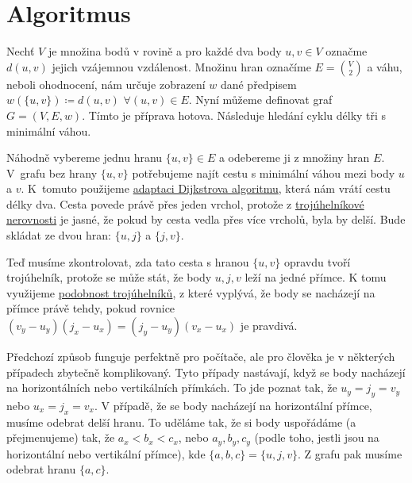 \section{Algoritmus}
\label{sec:algoritmus}

Nechť $V$ je množina bodů v rovině a pro každé dva body $u, v \in V$ označme $d(u, v)$ jejich vzájemnou vzdálenost. Množinu hran označíme $E = \binom{V}{2}$ a váhu, neboli ohodnocení, nám určuje zobrazení $w$ dané předpisem $w(\{u, v\}) \coloneqq d(u, v)$ $\forall (u, v) \in E$. Nyní můžeme definovat graf $G = (V, E, w)$.
Tímto je příprava hotova. Následuje hledání cyklu délky tři s minimální váhou.



Náhodně vybereme jednu hranu $\{u, v\} \in E$ a odebereme ji z množiny hran $E$. V~grafu bez hrany $\{u, v\}$ potřebujeme najít cestu s minimální váhou mezi body $u$ a  $v$. K~tomuto použijeme \hyperref[subsec:dijkstra_adaptace]{adaptaci Dijkstrova algoritmu}, která nám vrátí cestu délky dva. Cesta povede právě přes jeden vrchol, protože z \hyperref[tvrzeni:trojuhelnikova_nerovnost]{trojúhelníkové nerovnosti} je jasné, že pokud by cesta vedla přes více vrcholů, byla by delší. Bude skládat ze dvou hran: $\{u, j\}$ a $\{j, v\}$.

Teď musíme zkontrolovat, zda tato cesta s hranou $\{u, v\}$ opravdu tvoří trojúhelník, protože se může  stát, že body $u, j, v$ leží na jedné přímce. K tomu využijeme \hyperref[sec:podobnost]{podobnost trojúhelníků}, z které vyplývá, že body se nacházejí na přímce právě tehdy, pokud rovnice $(v_y - u_y)(j_x - u_x) = (j_y - u_y)(v_x - u_x)$ je pravdivá. 

\begin{poznamka}
Předchozí způsob funguje perfektně pro počítače, ale pro člověka je v některých případech zbytečně komplikovaný. Tyto případy nastávají, když se body nacházejí na horizontálních nebo vertikálních přímkách. To jde poznat tak, že $u_y = j_y = v_y$ nebo $u_x = j_x = v_x$.
V případě, že se body nacházejí na horizontální přímce, musíme odebrat delší hranu. To uděláme tak, že si body uspořádáme (a přejmenujeme) tak, že $a_x<b_x<c_x$, nebo $a_y, b_y, c_y$ (podle toho, jestli jsou na horizontální nebo vertikální přímce), kde $\{a, b, c\} = \{u, j, v\}$. Z grafu pak musíme odebrat hranu $\{a, c\}$.
\end{poznamka}



